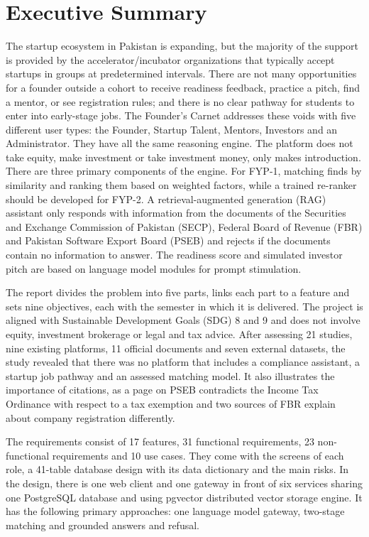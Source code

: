 \documentclass{FastFyp}
\begin{document}
\section*{Executive Summary}
The startup ecosystem in Pakistan is expanding, but the majority of the support is provided by the accelerator/incubator organizations that typically accept startups in groups at predetermined intervals. There are not many opportunities for a founder outside a cohort to receive readiness feedback, practice a pitch, find a mentor, or see registration rules; and there is no clear pathway for students to enter into early-stage jobs. The Founder's Carnet addresses these voids with five different user types: the Founder, Startup Talent, Mentors, Investors and an Administrator. They have all the same reasoning engine. The platform does not take equity, make investment or take investment money, only makes introduction. There are three primary components of the engine. For FYP-1, matching finds by similarity and ranking them based on weighted factors, while a trained re-ranker should be developed for FYP-2. A retrieval-augmented generation (RAG) assistant only responds with information from the documents of the Securities and Exchange Commission of Pakistan (SECP), Federal Board of Revenue (FBR) and Pakistan Software Export Board (PSEB) and rejects if the documents contain no information to answer. The readiness score and simulated investor pitch are based on language model modules for prompt stimulation.

The report divides the problem into five parts, links each part to a feature and sets nine objectives, each with the semester in which it is delivered. The project is aligned with Sustainable Development Goals (SDG) 8 and 9 and does not involve equity, investment brokerage or legal and tax advice. After assessing 21 studies, nine existing platforms, 11 official documents and seven external datasets, the study revealed that there was no platform that includes a compliance assistant, a startup job pathway and an assessed matching model. It also illustrates the importance of citations, as a page on PSEB contradicts the Income Tax Ordinance with respect to a tax exemption and two sources of FBR explain about company registration differently.

The requirements consist of 17 features, 31 functional requirements, 23 non-functional requirements and 10 use cases. They come with the screens of each role, a 41-table database design with its data dictionary and the main risks. In the design, there is one web client and one gateway in front of six services sharing one PostgreSQL database and using pgvector distributed vector storage engine. It has the following primary approaches: one language model gateway, two-stage matching and grounded answers and refusal.
\end{document}
